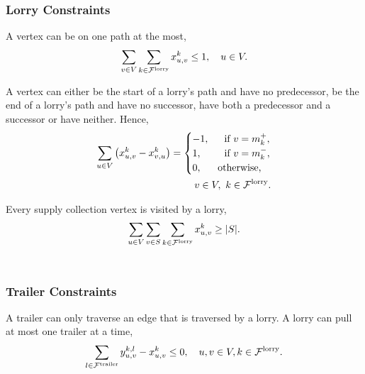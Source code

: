 \subsubsection{Lorry Constraints}


A vertex can be on one path at the most,
\begin{align}
\label{con:first}
 \sum_{v \in V}
 \sum_{k \in \mathcal F^{\rm lorry}}
 x^k_{u,v} \leq 1, \quad  u \in  V  .
\end{align}

A vertex can either  be the start of a lorry's path and have no predecessor,    be the end of a lorry's path and have no successor,  have both a predecessor and a successor or have neither.
Hence,
\begin{align}
  \sum_{u \in  V }
  \left( x^k_{u,v} -  x^k_{v,u} \right) =
  \begin{cases}
    -1,  & \ \text{ if } v = m^+_k, \\
    1, & \ \text{ if } v = m^-_k, \\
    0,  & \text{otherwise,}
  \end{cases} \\
  \quad v \in  V , \ k \in \mathcal F^{\rm lorry}. \notag
\end{align}

Every supply collection vertex
is visited by a lorry,
\begin{align}
  \label{con:customer_served}
   \sum_{u \in V}
   \sum_{v \in S}
   \sum_{k \in \mathcal F^{\rm lorry}}
x^k_{u,v} \geq |S| .
\end{align}
\\

\subsubsection{Trailer Constraints}

A trailer can only traverse an edge that is traversed by a lorry.
A lorry can pull at most one trailer at a time,
\begin{align}
  \sum_{l \in \mathcal F^{\rm trailer}} y^{k,l}_{u,v} - x_{u,v}^k \leq 0, \quad u,v \in V, k \in \mathcal{F}^{\rm lorry}.
\end{align}


